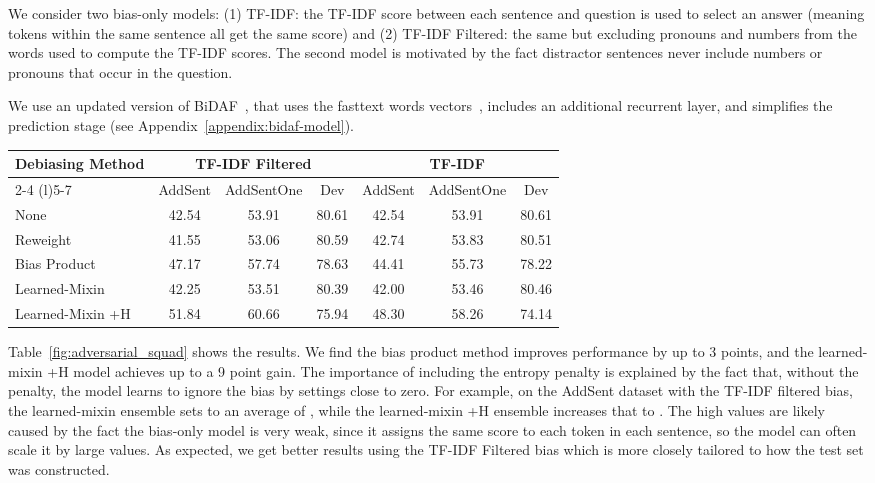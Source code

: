 \documentclass[11pt,a4paper]{article}
\begin{document}
 We consider two bias-only models: (1) TF-IDF: the TF-IDF score between each sentence and question is used to select an answer (meaning tokens within the same sentence all get the same score) and (2) TF-IDF Filtered: the same but excluding pronouns and numbers from the words used to compute the TF-IDF scores. The second model is motivated by the fact distractor sentences never include numbers or pronouns that occur in the question.


 We use an updated version of BiDAF~\cite{seo2016bidirectional}, that uses the fasttext words vectors~\cite{fasttext_word_vectors}, includes an additional recurrent layer, and simplifies the prediction stage (see Appendix~\ref{appendix:bidaf-model}).

\begin{table*}[]
\centering
    \tablefont
\begin{tabular}{lcccccc} \toprule
\multirow{2}{*}{Debiasing Method} & \multicolumn{3}{c}{TF-IDF Filtered} & \multicolumn{3}{c}{TF-IDF}\\
\cmidrule(r){2-4} \cmidrule(l){5-7}
 & AddSent & AddSentOne & Dev & AddSent & AddSentOne & Dev\\ \midrule
None & 42.54 & 53.91 & 80.61 & 42.54 & 53.91 & 80.61 \\
Reweight & 41.55 & 53.06 & 80.59 & 42.74 & 53.83 & 80.51 \\
Bias Product & 47.17 & 57.74 & 78.63 & 44.41 & 55.73 & 78.22 \\
Learned-Mixin & 42.25 & 53.51 & 80.39 & 42.00 & 53.46 & 80.46 \\
Learned-Mixin +H & 51.84 & 60.66 & 75.94 & 48.30 & 58.26 & 74.14 \\
\bottomrule
\end{tabular}
    \caption{F1 scores on Adversarial SQuAD and the standard SQuAD dev set using two different bias-only models.}
\label{fig:adversarial_squad}
\end{table*}

 Table~\ref{fig:adversarial_squad} shows the results. We find the bias product method improves performance by up to 3 points, and the learned-mixin +H model achieves up to a 9 point gain. The importance of including the entropy penalty is explained by the fact that, without the penalty, the model learns to ignore the bias by settings  close to zero. 
For example, on the AddSent dataset with the TF-IDF filtered bias, the learned-mixin ensemble sets  to an average of , while the learned-mixin +H ensemble increases that to .
The high values are likely caused by the fact the bias-only model is very weak, since it assigns the same score to each token in each sentence, so the model can often scale it by large values.
As expected, we get better results using the TF-IDF Filtered bias which is more closely tailored to how the test set was constructed.
\end{document}
